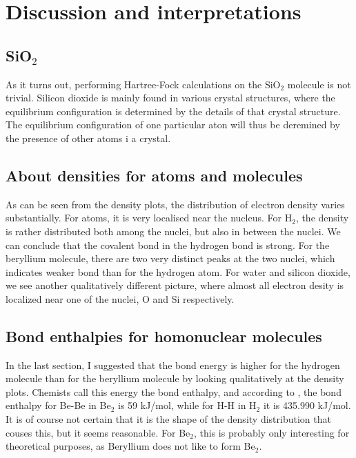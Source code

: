 \documentclass[a4paper,10pt, twocolumn, pre]{revtex4}
\begin{document}
\section{Discussion and interpretations}

\subsection{SiO$_2$}
As it turns out, performing Hartree-Fock calculations on the SiO$_2$ molecule is not trivial. Silicon dioxide is mainly found in various crystal structures, where the equilibrium configuration is determined by the details of that crystal structure. The equilibrium configuration of one particular aton will thus be deremined by the presence of other atoms i a crystal. 

\subsection{About densities for atoms and molecules}
As can be seen from the density plots, the distribution of electron density varies substantially. For atoms, it is very localised near the nucleus. For H$_2$, the density is rather distributed both among the nuclei, but also in between the nuclei. We can conclude that the covalent bond in the hydrogen bond is strong. For the beryllium molecule, there are two very distinct peaks at the two nuclei, which indicates weaker bond than for the hydrogen atom. For water and silicon dioxide, we see another qualitatively different picture, where almost all electron desity is localized near one of the nuclei, O and Si respectively. 

\subsection{Bond enthalpies for homonuclear molecules}
In the last section, I suggested that the bond energy is higher for the hydrogen molecule than for the beryllium molecule by looking qualitatively at the density plots. Chemists call this energy the bond enthalpy, and according to \cite{lide2004crc}, the bond enthalpy for Be-Be in Be$_2$ is 59 kJ/mol, while for H-H in H$_2$ it is 435.990 kJ/mol. It is of course not certain that it is the shape of the density distribution that couses this, but it seems reasonable. For Be$_2$, this is probably only interesting for theoretical purposes, as Beryllium does not like to form Be$_2$.
\end{document}
